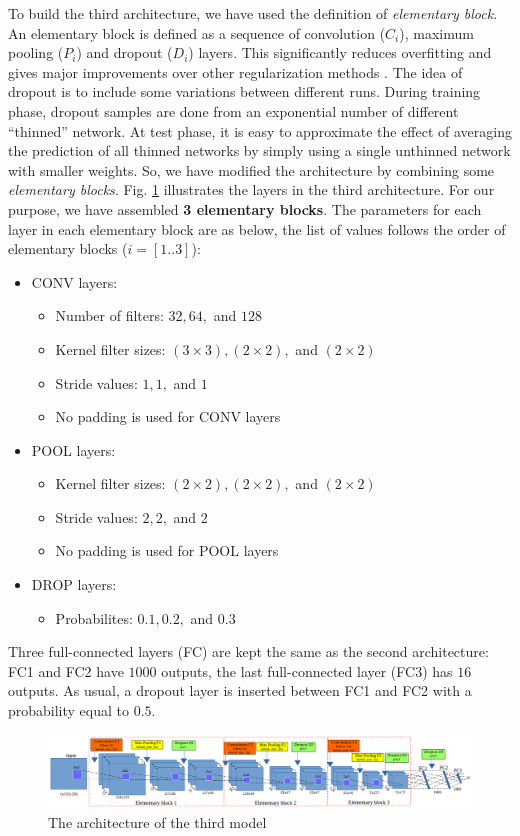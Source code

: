 To build the third architecture, we have used the definition of \textit{elementary block}. An {elementary block} is defined as a sequence of convolution ($C_{i}$), maximum pooling ($P_i$) and dropout ($D_i$) layers. This significantly reduces overfitting and gives major improvements over other regularization methods \cite{}. The idea of dropout is to include some variations between different runs. During training phase, dropout samples are done from an exponential number of different ``thinned” network. At test phase, it is easy to approximate the effect of averaging the prediction of all thinned networks by simply using a single unthinned network with smaller weights. So, we have modified the architecture by combining some \textit{elementary blocks}. Fig. \ref{fignet3} illustrates the layers in the third architecture. For our purpose, we have assembled \textbf{3 elementary blocks}. The parameters for each layer in each elementary block are as below, the list of values follows the order of elementary blocks ($i = [1..3]$):
\begin{itemize}
	\item CONV layers:
	\begin{itemize}
		\item Number of filters: $32, 64, $ and $128$
		\item Kernel filter sizes: $(3 \times 3), (2 \times 2), $ and $(2 \times 2)$
		\item Stride values: $1, 1, $ and $1$
		\item No padding is used for CONV layers 
	\end{itemize}
	\item POOL layers:
		\begin{itemize}
			\item Kernel filter sizes: $(2 \times 2), (2 \times 2), $ and $(2 \times 2)$
			\item Stride values: $2, 2, $ and $2$
			\item No padding is used for POOL layers
		\end{itemize}
	\item DROP layers:
		\begin{itemize}
			\item Probabilites: $0.1, 0.2, $ and $0.3$
		\end{itemize}
\end{itemize}

Three full-connected layers (FC) are kept the same as the second architecture: FC1 and FC2 have $1000$ outputs, the last full-connected layer (FC3) has $16$ outputs. As usual, a dropout layer is inserted between FC1 and FC2 with a probability equal to $0.5$.
\begin{figure}[h]
	\centering
	\includegraphics[scale=0.3]{images/arch_model}
	\caption{The architecture of the third model}
	\label{fignet3}
\end{figure}

